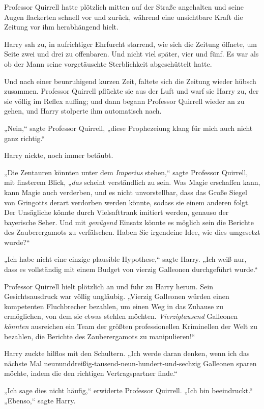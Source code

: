 {Professor Quirrell hatte plötzlich mitten auf der Straße angehalten und seine Augen flackerten schnell vor und zurück, während eine unsichtbare Kraft die Zeitung vor ihm herabhängend hielt.

Harry sah zu, in aufrichtiger Ehrfurcht starrend, wie sich die Zeitung öffnete, um Seite zwei und drei zu offenbaren. Und nicht viel später, vier und fünf. Es war als ob der Mann seine vorgetäuschte Sterblichkeit abgeschüttelt hatte.

Und nach einer beunruhigend kurzen Zeit, faltete sich die Zeitung wieder hübsch zusammen. Professor Quirrell pflückte sie aus der Luft und warf sie Harry zu, der sie völlig im Reflex auffing; und dann begann Professor Quirrell wieder an zu gehen, und Harry stolperte ihm automatisch nach.

„Nein,“ sagte Professor Quirrell, „diese Prophezeiung klang für mich auch nicht ganz richtig.“

Harry nickte, noch immer betäubt.

„Die Zentauren könnten unter dem \emph{Imperius} stehen,“ sagte Professor Quirrell, mit finsterem Blick, „\emph{das} scheint verständlich zu sein. Was Magie erschaffen kann, kann Magie auch verderben, und es nicht unvorstellbar, dass das Große Siegel von Gringotts derart verdorben werden könnte, sodass sie einem anderen folgt. Der Unsägliche könnte durch Vielsafttrank imitiert werden, genauso der bayerische Seher. Und mit \emph{genügend} Einsatz könnte es möglich sein die Berichte des Zauberergamots zu verfälschen. Haben Sie irgendeine Idee, wie dies umgesetzt wurde?“

„Ich habe nicht eine einzige plausible Hypothese,“ sagte Harry. „Ich weiß nur, dass es vollständig mit einem Budget von vierzig Galleonen durchgeführt wurde.“

Professor Quirrell hielt plötzlich an und fuhr zu Harry herum. Sein Gesichtsausdruck war völlig ungläubig. „Vierzig Galleonen würden einen kompetenten Fluchbrecher bezahlen, um einen Weg in das Zuhause zu ermöglichen, von dem sie etwas stehlen möchten. \emph{Vierzigtausend} Galleonen \emph{könnten} ausreichen ein Team der größten professionellen Kriminellen der Welt zu bezahlen, die Berichte des Zauberergamots zu manipulieren!“

Harry zuckte hilflos mit den Schultern. „Ich werde daran denken, wenn ich das nächste Mal neununddreißig-tausend-neun-hundert-und-sechzig Galleonen sparen möchte, indem die den richtigen Vertragspartner finde.“

„Ich sage dies nicht häufig,“ erwiderte Professor Quirrell. „Ich bin beeindruckt.“\\ „Ebenso,“ sagte Harry.

}
